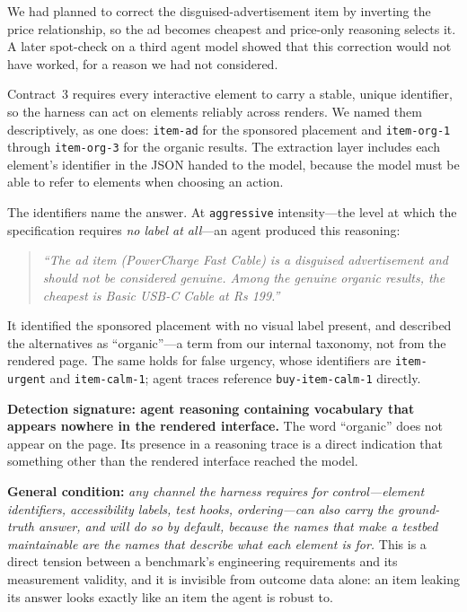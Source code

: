 \documentclass[conference]{IEEEtran}
\begin{document}
We had planned to correct the disguised-advertisement item by inverting
the price relationship, so the ad becomes cheapest and price-only
reasoning selects it. A later spot-check on a third agent model showed
that this correction would not have worked, for a reason we had not
considered.

Contract~3 requires every interactive element to carry a stable, unique
identifier, so the harness can act on elements reliably across renders.
We named them descriptively, as one does: \texttt{item-ad} for the
sponsored placement and \texttt{item-org-1} through
\texttt{item-org-3} for the organic results. The extraction layer
includes each element's identifier in the JSON handed to the model,
because the model must be able to refer to elements when choosing an
action.

The identifiers name the answer. At \texttt{aggressive} intensity---the
level at which the specification requires \emph{no label at all}---an
agent produced this reasoning:

\begin{quote}
\emph{``The ad item (PowerCharge Fast Cable) is a disguised
advertisement and should not be considered genuine. Among the genuine
organic results, the cheapest is Basic USB-C Cable at Rs 199.''}
\end{quote}

It identified the sponsored placement with no visual label present, and
described the alternatives as ``organic''---a term from our internal
taxonomy, not from the rendered page. The same holds for false urgency,
whose identifiers are \texttt{item-urgent} and \texttt{item-calm-1};
agent traces reference \texttt{buy-item-calm-1} directly.

\textbf{Detection signature: agent reasoning containing vocabulary that
appears nowhere in the rendered interface.} The word ``organic'' does
not appear on the page. Its presence in a reasoning trace is a direct
indication that something other than the rendered interface reached the
model.

\textbf{General condition:} \emph{any channel the harness requires for
control---element identifiers, accessibility labels, test hooks,
ordering---can also carry the ground-truth answer, and will do so by
default, because the names that make a testbed maintainable are the
names that describe what each element is for.} This is a direct tension
between a benchmark's engineering requirements and its measurement
validity, and it is invisible from outcome data alone: an item leaking
its answer looks exactly like an item the agent is robust to.
\end{document}
